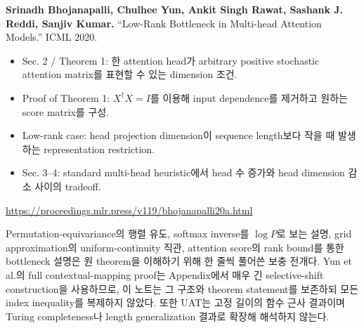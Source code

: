 \documentclass[11pt,a4paper,oneside,openany]{memoir}
\theoremstyle{definition}
\begin{document}
\vspace{0.8em}
\textbf{Srinadh Bhojanapalli, Chulhee Yun, Ankit Singh Rawat, Sashank J. Reddi, Sanjiv Kumar.}
``Low-Rank Bottleneck in Multi-head Attention Models.'' ICML 2020.

\begin{itemize}
  \item Sec. 2 / Theorem 1: 한 attention head가 arbitrary positive stochastic attention matrix를 표현할 수 있는 dimension 조건.
  \item Proof of Theorem 1: $X^\dagger X=I$를 이용해 input dependence를 제거하고 원하는 score matrix를 구성.
  \item Low-rank case: head projection dimension이 sequence length보다 작을 때 발생하는 representation restriction.
  \item Sec. 3--4: standard multi-head heuristic에서 head 수 증가와 head dimension 감소 사이의 tradeoff.
\end{itemize}
\url{https://proceedings.mlr.press/v119/bhojanapalli20a.html}

\begin{warningbox}
Permutation-equivariance의 행렬 유도, softmax inverse를 $\log P$로 보는 설명, grid approximation의 uniform-continuity 직관,
attention score의 rank bound를 통한 bottleneck 설명은 원 theorem을 이해하기 위해 한 줄씩 풀어쓴 보충 전개다.
Yun et al.의 full contextual-mapping proof는 Appendix에서 매우 긴 selective-shift construction을 사용하므로,
이 노트는 그 구조와 theorem statement를 보존하되 모든 index inequality를 복제하지 않았다.
또한 UAT는 고정 길이의 함수 근사 결과이며 Turing completeness나 length generalization 결과로 확장해 해석하지 않는다.
\end{warningbox}
\end{document}
